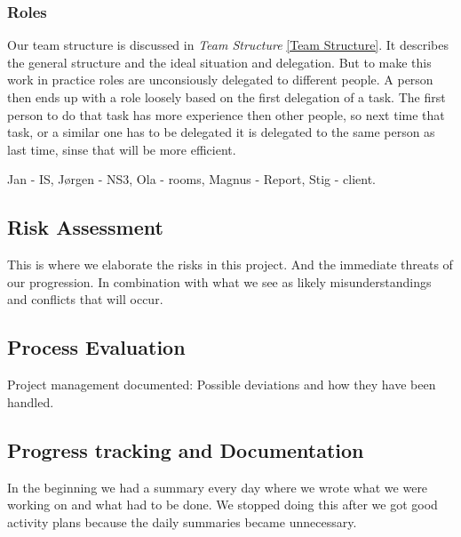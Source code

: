     \subsubsection{Roles}\label{roles}
    Our team structure is discussed in \textit{Team Structure} \ref{Team Structure}. It describes the general structure and the ideal situation and delegation. 
    But to make this work in practice roles are unconsiously delegated to different people. A person then ends up with a role loosely based on the first delegation of a task. The first person to do that task has more experience then other people, so next time that task, or a similar one has to be delegated it is delegated to the same person as last time, sinse that will be more efficient. 
        
     Jan - IS, Jørgen - NS3, Ola - rooms, Magnus - Report, Stig - client.
    
    \subsection{Risk Assessment}\label{Risk Assessment}
    This is where we elaborate the risks in this project. And the immediate threats of our progression. In combination with what we see as likely misunderstandings and conflicts that will occur. 
    
    \subsection{Process Evaluation}\label{Process Evaluation}
    
    Project management documented: 
    Possible deviations and how they have
been handled. 

    \subsection{Progress tracking and Documentation}\label{Progress tracking and Documentation}
    In the beginning we had a summary every day where we wrote what we were working on and what had to be done. We stopped doing this after we got good activity plans because the daily summaries became unnecessary. 
    
